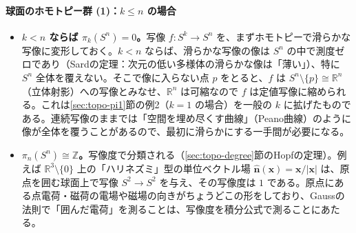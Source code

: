\documentclass[uplatex, dvipdfmx, book]{jsbook}
\begin{document}
\paragraph{球面のホモトピー群 (1)：$k \le n$ の場合}
\begin{itemize}
    \item \textbf{$k < n$ ならば $\pi_k(S^n) = 0$。}写像 $f: S^k \to S^n$ を、まずホモトピーで滑らかな写像に変形しておく。$k < n$ ならば、滑らかな写像の像は $S^n$ の中で測度ゼロであり（Sardの定理：次元の低い多様体の滑らかな像は「薄い」）、特に $S^n$ 全体を覆えない。そこで像に入らない点 $p$ をとると、$f$ は $S^n \setminus \{p\} \cong \mathbb{R}^n$（立体射影）への写像とみなせ、$\mathbb{R}^n$ は可縮なので $f$ は定値写像に縮められる。これは\ref{sec:topo-pi1}節の例2（$k = 1$ の場合）を一般の $k$ に拡げたものである。連続写像のままでは「空間を埋め尽くす曲線」（Peano曲線）のように像が全体を覆うことがあるので、最初に滑らかにする一手間が必要になる。
    \item \textbf{$\pi_n(S^n) \cong \mathbb{Z}$。}写像度で分類される（\ref{sec:topo-degree}節のHopfの定理）。例えば $\mathbb{R}^3 \setminus \{0\}$ 上の「ハリネズミ」型の単位ベクトル場 $\hat{\bm{n}}(\bm{x}) = \bm{x}/|\bm{x}|$ は、原点を囲む球面上で写像 $S^2 \to S^2$ を与え、その写像度は $1$ である。原点にある点電荷・磁荷の電場や磁場の向きがちょうどこの形をしており、Gaussの法則で「囲んだ電荷」を測ることは、写像度を積分公式で測ることにあたる。
\end{itemize}
\end{document}
